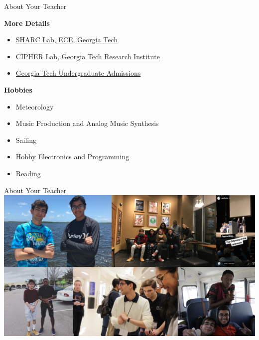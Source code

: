 \documentclass[]{beamer}
\begin{document}
\begin{frame}{About Your Teacher}

    \textbf{More Details}
    \begin{itemize}
        \item \href{https://sharclab.ece.gatech.edu/}{SHARC Lab, ECE, Georgia Tech}
        \item \href{https://www.gtri.gatech.edu/laboratories/cybersecurity-information-protection-and-hardware-evaluation-research}{CIPHER Lab, Georgia Tech Research Institute}
        \item \href{https://admission.gatech.edu/}{Georgia Tech Undergraduate Admissions}
    \end{itemize}

    \vspace{\baselineskip}

    \textbf{Hobbies}
    \begin{itemize}
        \item Meteorology
        \item Music Production and Analog Music Synthesis
        \item Sailing
        \item Hobby Electronics and Programming
        \item Reading
    \end{itemize}
    
\end{frame}

\begin{frame}{About Your Teacher}
    \includegraphics[width=\textwidth]{imgs/me_3.jpg}
\end{frame}
\end{document}
